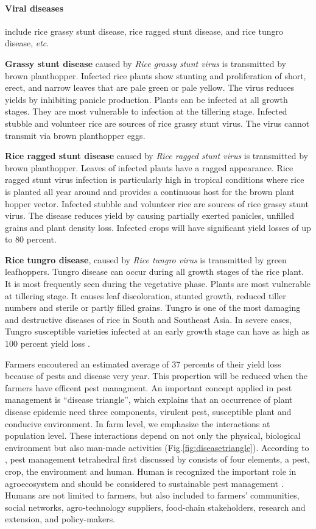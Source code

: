 \documentclass[12pt, oneside]{report}
\begin{document}
\paragraph{Viral diseases} include rice grassy stunt disease, rice ragged stunt disease, and rice tungro disease, \textit{etc}. 

\textbf{Grassy stunt disease} caused by \textit{Rice grassy stunt virus} is transmitted by brown planthopper. Infected rice plants show stunting and proliferation of short, erect, and narrow leaves that are pale green or pale yellow. The virus reduces yields by inhibiting panicle production. Plants can be infected at all growth stages. They are most vulnerable to infection at the tillering stage. Infected stubble and volunteer rice are sources of rice grassy stunt virus. The virus cannot transmit via brown planthopper eggs.

\textbf{Rice ragged stunt disease} caused by \textit{Rice ragged stunt virus} is transmitted by brown planthopper. Leaves of infected plants have a ragged appearance. Rice ragged stunt virus infection is particularly high in tropical conditions where rice is planted all year around and provides a continuous host for the brown plant hopper vector. Infected stubble and volunteer rice are sources of rice grassy stunt virus. The disease reduces yield by causing partially exerted panicles, unfilled grains and plant density loss. Infected crops will have significant yield losses of up to 80 percent.

\textbf{Rice tungro disease}, caused by \textit{Rice tungro virus} is transmitted by green leafhoppers. Tungro disease can occur during all growth stages of the rice plant. It is most frequently seen during the vegetative phase. Plants are most vulnerable at tillering stage. It causes leaf discoloration, stunted growth, reduced tiller numbers and sterile or partly filled grains. Tungro is one of the most damaging and destructive diseases of rice in South and Southeast Asia. In severe cases, Tungro susceptible varieties infected at an early growth stage can have as high as 100 percent yield loss \cite{irrirkb}.

Farmers encoutered an estimated average of 37 percents of their yield loss because of pests and disease very year. This propertion will be reduced when the farmers have efficent pest managment. An important concept applied in pest management is ``disease triangle'', which explains that an occurrence of plant disease epidemic need three components, virulent pest, susceptible plant and conducive environment. In farm level, we emphasize the interactions at population level. These interactions depend on not only the physical, biological environment but also man-made activities (Fig.\ref{fig:diseasetriangle}). According to \citet{Savary:2006to}, pest management tetrahedral first discussed by \cite{Zadoks:1979ts} consists of four elements, a pest, crop, the environment and human. Human is recognized the important role in agroecosystem and should be considered to sustainable pest management \citep{Zadok1985}. Humans are not limited to farmers, but also included to farmers' communities, social networks, agro-technology suppliers, food-chain stakeholders, research and extension, and policy-makers.
\end{document}
